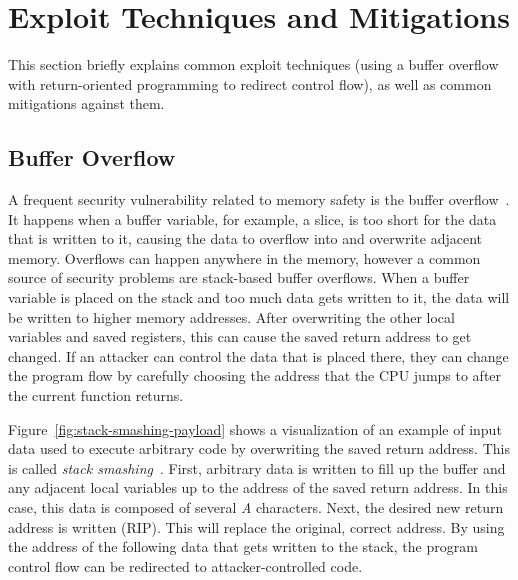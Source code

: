 
\section{Exploit Techniques and Mitigations}\label{sec:background:exploit-techniques}

This section briefly explains common exploit techniques (using a buffer overflow with return-oriented programming to
redirect control flow), as well as common mitigations against them.



\subsection{Buffer Overflow}\label{subsec:background:exploit-techniques:buffer-overflow}

A frequent security vulnerability related to memory safety is the buffer overflow~\cite{larochelle2001}.
It happens when a buffer variable, for example, a slice, is too short for the data that is written to it, causing the
data to overflow into and overwrite adjacent memory.
Overflows can happen anywhere in the memory, however a common source of security problems are stack-based buffer
overflows.
When a buffer variable is placed on the stack and too much data gets written to it, the data will be written to higher
memory addresses.
After overwriting the other local variables and saved registers, this can cause the saved return address to get changed.
If an attacker can control the data that is placed there, they can change the program flow by carefully choosing the
address that the \acrshort{CPU} jumps to after the current function returns.

Figure~\ref{fig:stack-smashing-payload} shows a visualization of an example of input data used to execute arbitrary code
by overwriting the saved return address.
This is called \textit{stack smashing}~\cite{smith1997}.
First, arbitrary data is written to fill up the buffer and any adjacent local variables up to the address of the
saved return address.
In this case, this data is composed of several \textit{A} characters.
Next, the desired new return address is written (\acrshort{RIP}).
This will replace the original, correct address.
By using the address of the following data that gets written to the stack, the program control flow can be redirected to
attacker-controlled code.

